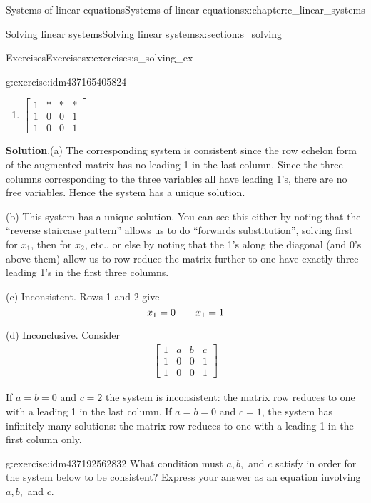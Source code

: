\documentclass[oneside,10pt,]{book}
\newcommand{\blocktitlefont}{\relax}
\numberwithin{equation}{section}
\newcommand{\amp}{&}
\begin{document}
\begin{chapterptx}{Systems of linear equations}{}{Systems of linear equations}{}{}{x:chapter:c_linear_systems}
\begin{sectionptx}{Solving linear systems}{}{Solving linear systems}{}{}{x:section:s_solving}
\begin{exercises-subsection-numberless}{Exercises}{}{Exercises}{}{}{x:exercises:s_solving_ex}
\begin{divisionexercise}{9}{}{}{g:exercise:idm437165405824}
\begin{enumerate}[marker=(\alph*)]
\item{}\(\displaystyle \begin{bmatrix}1\amp *\amp *\amp *\\ 1\amp 0\amp 0\amp 1\\ 1\amp 0\amp 0\amp 1 \end{bmatrix}\)%
\end{enumerate}
%
\par\smallskip%
\noindent\textbf{\blocktitlefont Solution}.\hypertarget{g:solution:idm437165399520}{}\quad{}(a) The corresponding system is consistent since the row echelon form of the augmented matrix has no leading 1 in the last column. Since the three columns corresponding to the three variables all have leading 1's, there are no free variables. Hence the system has a unique solution.%
\par
(b) This system has a unique solution. You can see this either by noting that the ``reverse staircase pattern'' allows us to do ``forwards substitution'', solving first for \(x_1\), then for \(x_2\), etc., or else by noting that the 1's along the diagonal (and 0's above them) allow us to row reduce the matrix further to one have exactly three leading 1's in the first three columns.%
\par
(c) Inconsistent. Rows 1 and 2 give%
\begin{equation*}
x_1 = 0 \hspace{7mm} x_1 = 1
\end{equation*}
%
\par
(d) Inconclusive. Consider%
\begin{align*}
\begin{bmatrix}1\amp a\amp b\amp c\\ 1\amp 0\amp 0\amp 1\\ 1\amp 0\amp 0\amp 1 \end{bmatrix}
\end{align*}
%
\par
If \(a=b=0\) and \(c=2\) the system is inconsistent: the matrix row reduces to one with a leading 1 in the last column. If \(a = b = 0\) and \(c=1\), the system has infinitely many solutions: the matrix row reduces to one with a leading 1 in the first column only.%
\end{divisionexercise}%
\begin{divisionexercise}{10}{}{}{g:exercise:idm437192562832}%
What condition must \(a, b,\) and \(c\) satisfy in order for the system below to be consistent? Express your answer as an equation involving \(a, b,\) and \(c\).%
\begin{equation*}

\end{equation*}
\end{divisionexercise}
\end{exercises-subsection-numberless}
\end{sectionptx}
\end{chapterptx}
\end{document}
